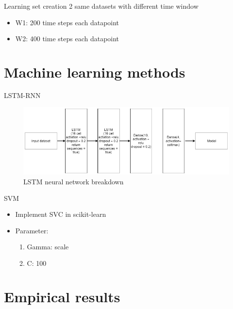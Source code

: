 \documentclass[xcolor=dvipsnames]{beamer} %
\begin{document}
	\begin{frame}{Learning set creation}
	    2 same datasets with different time window
	    \begin{itemize}
	        \item W1: 200 time steps each datapoint
	        \item W2: 400 time steps each datapoint
	    \end{itemize}
	\end{frame}
	
	\section{Machine learning methods}
	
	\begin{frame}{LSTM-RNN}
		\begin{figure}
		    \centering
		    \includegraphics[scale = 0.4]{images/LSTMDiagram.png}
		    \caption{LSTM neural network breakdown}
		    \label{fig:my_label}
		\end{figure}
	\end{frame}
	
	\begin{frame}{SVM}
		\begin{itemize}
		    \item Implement SVC in scikit-learn
		    \item Parameter:
		        \begin{enumerate}
		            \item Gamma: scale
		            \item C: 100
		        \end{enumerate}
		\end{itemize}
	\end{frame}
	
	\section{Empirical results}
	
\end{document}
